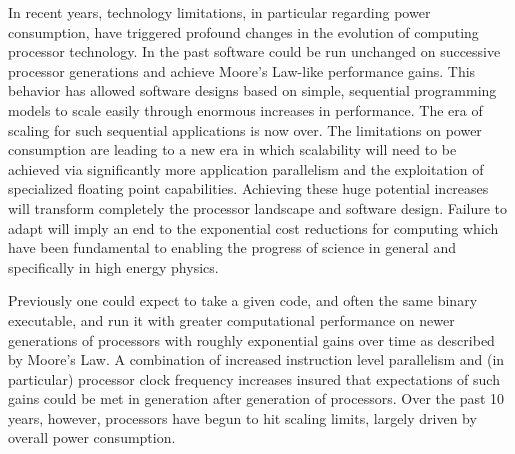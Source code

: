 In recent years, technology limitations, in particular
regarding power consumption, have triggered profound changes in the
evolution of computing processor technology. In the past software
could be run unchanged on successive processor generations and
achieve Moore's Law-like performance gains. This behavior has
allowed software designs based on simple, sequential programming
models to scale easily through enormous increases in
performance. The era of scaling for such sequential applications is
now over. The limitations on power consumption are leading to a new
era in which scalability will need to be achieved via significantly
more application parallelism and the exploitation of specialized
floating point capabilities. Achieving these huge potential
increases will transform completely the processor landscape and
software design. Failure to adapt will imply an end to the
exponential cost reductions for computing which have been
fundamental to enabling the progress of science in general and
specifically in high energy physics.

Previously one could expect to take a given code, and often the
same binary executable, and run it with greater computational
performance on newer generations of processors with roughly exponential
gains over time as described by Moore's Law.  A combination of increased
instruction level parallelism and (in particular) processor clock frequency
increases insured that expectations of such gains could be met in generation
after generation of processors. Over the past 10 years, however,
processors have begun to hit scaling limits, largely driven by overall
power consumption.

